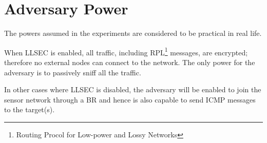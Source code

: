 \section{Adversary Power}

The powers assumed in the experiments are considered to be practical in real life.

When LLSEC is enabled, all traffic, including RPL\footnote{Routing Procol for Low-power and Lossy Networks} messages, are encrypted; therefore no external nodes can connect to the network. The only power for the adversary is to passively sniff all the traffic.

In other cases where LLSEC is disabled, the adversary will be  enabled to join the sensor network through a BR and hence is also capable to send ICMP messages to the target(s).